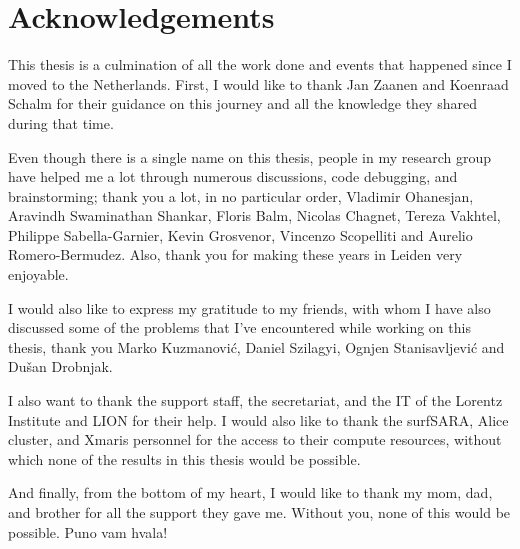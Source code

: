 \newpage
\thispagestyle{empty}

\chapter*{Acknowledgements}
\label{Acknowledgements}

This thesis is a culmination of all the work done and events that happened since I moved to the Netherlands. First, I would like to thank Jan Zaanen and Koenraad Schalm for their guidance on this journey and all the knowledge they shared during that time. 
\par
Even though there is a single name on this thesis, people in my research group have helped me a lot through numerous discussions, code debugging, and brainstorming; thank you a lot, in no particular order, Vladimir Ohanesjan, Aravindh Swaminathan Shankar, Floris Balm, Nicolas Chagnet, Tereza Vakhtel, Philippe Sabella-Garnier, Kevin Grosvenor, Vincenzo Scopelliti and Aurelio Romero-Bermudez. Also, thank you for making these years in Leiden very enjoyable.
\par
I would also like to express my gratitude to my friends, with whom I have also discussed some of the problems that I've encountered while working on this thesis, thank you Marko Kuzmanović, Daniel Szilagyi, Ognjen Stanisavljević and Dušan Drobnjak.
\par
I also want to thank the support staff, the secretariat, and the IT of the Lorentz Institute and LION for their help. I would also like to thank the surfSARA, Alice cluster, and Xmaris personnel for the access to their compute resources, without which none of the results in this thesis would be possible.
\par
And finally, from the bottom of my heart, I would like to thank my mom, dad, and brother for all the support they gave me. Without you, none of this would be possible. Puno vam hvala!   

\newpage
\thispagestyle{empty}